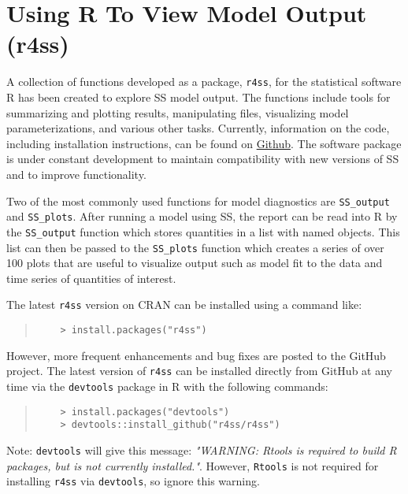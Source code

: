 
\section{Using R To View Model Output (r4ss)}\label{r4ss}

A collection of functions developed as a package, \texttt{r4ss}, for the statistical software R has been created to explore SS model output.  The functions include tools for summarizing and plotting results, manipulating files, visualizing model parameterizations, and various other tasks.  Currently, information on the code, including installation instructions, can be found on \href{https://github.com/r4ss/r4ss}{Github}.  The software package is under constant development to maintain compatibility with new versions of SS and to improve functionality.

Two of the most commonly used functions for model diagnostics are \texttt{SS\_output} and \texttt{SS\_plots}.  After running a model using SS, the report can be read into R by the \texttt{SS\_output} function which stores quantities in a list with named objects.  This list can then be passed to the \texttt{SS\_plots} function which creates a series of over 100 plots that are useful to visualize output such as model fit to the data and time series of quantities of interest.

The latest \texttt{r4ss} version on CRAN can be installed using a command like:

\begin{quote}
	\begin{verbatim}
	> install.packages("r4ss")
	\end{verbatim}
\end{quote}


However, more frequent enhancements and bug fixes are posted to the GitHub project.  The latest version of \texttt{r4ss} can be installed directly from GitHub at any time via the \texttt{devtools} package in R with the following commands:

\begin{quote}
	\begin{verbatim}
	> install.packages("devtools")
	> devtools::install_github("r4ss/r4ss")
	\end{verbatim}
\end{quote}

Note: \texttt{devtools} will give this message: \textit{"WARNING: Rtools is required to build R packages, but is not currently installed."}. However, \texttt{Rtools} is not required for installing \texttt{r4ss} via \texttt{devtools}, so ignore this warning.

